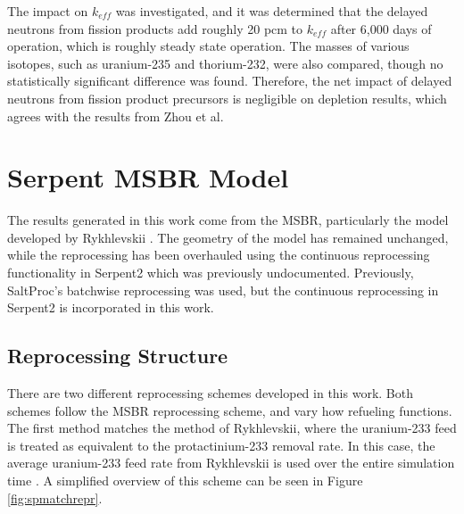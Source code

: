 The impact on $k_{eff}$ was investigated, and it was determined that the delayed neutrons from fission products add roughly 20 pcm to $k_{eff}$ after 6,000 days of operation, which is roughly steady state operation. The masses of various isotopes, such as uranium-235 and thorium-232, were also compared, though no statistically significant difference was found. Therefore, the net impact of delayed neutrons from fission product precursors is negligible on depletion results, which agrees with the results from Zhou et al.











\section{Serpent MSBR Model}

The results generated in this work come from the MSBR, particularly the model developed by Rykhlevskii \cite{rykhlevskii_advanced_2018}. The geometry of the model has remained unchanged, while the reprocessing has been overhauled using the continuous reprocessing functionality in Serpent2 which was previously undocumented. Previously, SaltProc's batchwise reprocessing was used, but the continuous reprocessing in Serpent2 is incorporated in this work.

\subsection{Reprocessing Structure}

There are two different reprocessing schemes developed in this work. Both schemes follow the MSBR reprocessing scheme, and vary how refueling functions. The first method matches the method of Rykhlevskii, where the uranium-233 feed is treated as equivalent to the protactinium-233 removal rate. In this case, the average uranium-233 feed rate from Rykhlevskii is used over the entire simulation time \cite{rykhlevskii_advanced_2018}. A simplified overview of this scheme can be seen in Figure \ref{fig:spmatchrepr}.


